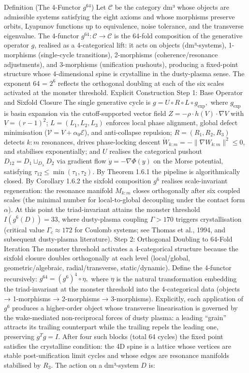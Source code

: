 Definition (The 4-Functor $  g^{64}  $)
Let $  \mathcal{C}  $ be the category dm³ whose objects are admissible systems satisfying the eight axioms and whose morphisms preserve orbits, Lyapunov functions up to equivalence, noise tolerance, and the transverse eigenvalue. The 4-functor $  g^{64} : \mathcal{C} \to \mathcal{C}  $ is the 64-fold composition of the generative operator $  g  $, realised as a 4-categorical lift: it acts on objects (dm³-systems), 1-morphisms (single-cycle transitions), 2-morphisms (coherence/resonance adjustments), and 3-morphisms (unification pushouts), producing a fixed-point structure whose 4-dimensional spine is crystalline in the dusty-plasma sense. The exponent 64 = $  2^6  $ reflects the orthogonal doubling at each of the six scales activated at the monster threshold.
Explicit Construction
Step 1: Base Operator and Sixfold Closure
The single generative cycle is
$   g = U \circ R \circ L \circ g_{\text{exp}},   $
where $  g_{\text{exp}}  $ is basin expansion via the cutoff-supported vector field $  Z = -\rho \cdot h(V) \cdot \nabla V  $ with $  V = (r-1)^2  $; $  L = (L_1, L_2, L_3)  $ enforces local phase alignment, global defect minimisation ($  \mathcal{V} = V + \alpha_0 \mathcal{E}  $), and anti-collapse repulsion; $  R = (R_1, R_2, R_3)  $ detects $  k:m  $ resonances, drives phase-locking descent $  \dot{W}_{k:m} = -\|\nabla W_{k:m}\|^2 \le 0  $, and stabilises exponentially; and $  U  $ realises the categorical pushout $  D_{12} = D_1 \sqcup_{D_\lambda} D_2  $ via gradient flow $  \dot{y} = -\nabla \Phi(y)  $ on the Morse potential, satisfying $  \tau_{12} \le \min(\tau_1, \tau_2)  $.
By Theorem 1.6.1 the pipeline is algorithmically closed. By Corollary 1.6.2 the sixfold composition $  g^6  $ realises scale-invariant regeneration: the resonance manifold $  M_{k:m}  $ closes orthogonally after six coupled scales (the minimal number for local-to-global decoupling under the contact form $  \alpha  $). At this point the triad-invariant attains the monster threshold $  I(g^6(D)) = 33  $, where dusty-plasma coupling $  \Gamma > 170  $ triggers crystallisation (critical value $  \Gamma_c \approx 172  $ for Coulomb systems; see Thomas et al., 1994, and subsequent dusty-plasma literature).
Step 2: Orthogonal Doubling to 64-Fold Iteration
The monster threshold activates a 4-categorical structure because the sixfold closure doubles orthogonally at each level (local/global, geometric/algebraic, radial/transverse, static/dynamic). Define the 4-functor recursively:
$   g^{64} = (g^6)^4 \circ \eta,   $
where $  \eta  $ is the natural transformation embedding the triad-invariant at the monster threshold into the 4-categorical data (objects → 1-morphisms → 2-morphisms → 3-morphisms). Explicitly, each application of $  g^6  $ produces a higher-order object whose transverse linearisation is governed by the wake-mediated non-reciprocal forces of dusty plasma: a leading “grain” attracts its trailing counterpart while the trailing repels the leading one, preserving $  g^T g = I  $. After four such blocks (total 64 cycles) the fixed point satisfies the crystalline condition: the 4D spine is a lattice whose vertices are stable post-unification limit cycles and whose edges are resonance manifolds stabilised by $  R_3  $.
The action on a dm³-system $  D  $ is:

